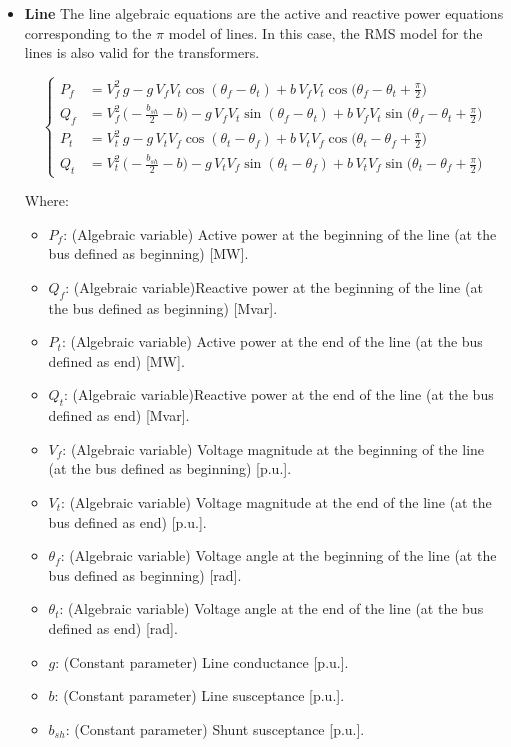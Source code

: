 \begin{itemize}

\item \textbf{Line}
The line algebraic equations are the active and reactive power equations corresponding to the $\pi$ model of lines.
In this case, the RMS model for the lines is also valid for the transformers.

\begin{equation}
\begin{cases}
P_f &= V_{f}^2 \, g - g \, V_{f} V_{t} \cos(\theta_{f} - \theta_{t}) + b \, V_{f} V_{t} \cos\Big(\theta_{f} - \theta_{t} + \frac{\pi}{2}\Big) \\
Q_f &= V_{f}^2 \, \Big(-\frac{b_{sh}}{2} - b \Big) - g \, V_{f} V_{t} \sin(\theta_{f} - \theta_{t}) + b \, V_{f} V_{t} \sin\Big(\theta_{f} - \theta_{t} + \frac{\pi}{2}\Big) \\
P_t &= V_{t}^2 \, g - g \, V_{t} V_{f} \cos(\theta_{t} - \theta_{f}) + b \, V_{t} V_{f} \cos\Big(\theta_{t} - \theta_{f} + \frac{\pi}{2}\Big) \\
Q_t &= V_{t}^2 \, \Big(-\frac{b_{sh}}{2} - b \Big) - g \, V_{t} V_{f} \sin(\theta_{t} - \theta_{f}) + b \, V_{t} V_{f} \sin\Big(\theta_{t} - \theta_{f} + \frac{\pi}{2}\Big)
\end{cases}
\label{eq:alg_eq_line}
\end{equation}

Where:
\begin{itemize}
  \item $P_{f}$: (Algebraic variable) Active power at the beginning of the line (at the bus defined as beginning) [MW].
  \item $Q_{f}$: (Algebraic variable)Reactive power at the beginning of the line (at the bus defined as beginning) [Mvar].
  \item $P_{t}$: (Algebraic variable) Active power at the end of the line (at the bus defined as end) [MW].
  \item $Q_{t}$: (Algebraic variable)Reactive power at the end of the line (at the bus defined as end) [Mvar].
  \item $V_f$: (Algebraic variable) Voltage magnitude at the beginning of the line (at the bus defined as beginning) [p.u.].
  \item $V_t$: (Algebraic variable) Voltage magnitude at the end of the line (at the bus defined as end) [p.u.].
  \item $\theta_f$: (Algebraic variable) Voltage angle at the beginning of the line (at the bus defined as beginning) [rad].
  \item $\theta_t$: (Algebraic variable) Voltage angle at the end of the line (at the bus defined as end) [rad].
  \item $g$: (Constant parameter) Line conductance [p.u.].
  \item $b$: (Constant parameter) Line susceptance [p.u.].
  \item $b_{sh}$: (Constant parameter) Shunt susceptance [p.u.].
\end{itemize}

\end{itemize}

